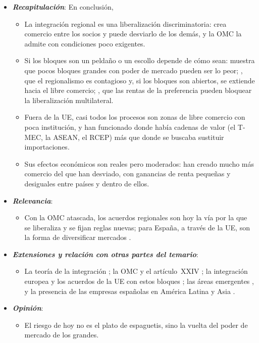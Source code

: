 \documentclass[11pt]{article}
\begin{document}
\begin{itemize}
\item \textbf{\emph{Recapitulación}}: En conclusión,
  \begin{itemize}
  \item La integración regional es una liberalización discriminatoria: crea comercio entre los socios y puede desviarlo de los demás, y la OMC la admite con condiciones poco exigentes.
  \item Si los bloques son un peldaño o un escollo depende de cómo sean:  muestra que pocos bloques grandes con poder de mercado pueden ser lo peor; , que el regionalismo es contagioso y, si los bloques son abiertos, se extiende hacia el libre comercio; , que las rentas de la preferencia pueden bloquear la liberalización multilateral.
  \item Fuera de la UE, casi todos los procesos son zonas de libre comercio con poca institución, y han funcionado donde había cadenas de valor (el T-MEC, la ASEAN, el RCEP) más que donde se buscaba sustituir importaciones.
  \item Sus efectos económicos son reales pero moderados: han creado mucho más comercio del que han desviado, con ganancias de renta pequeñas y desiguales entre países y dentro de ellos.
  \end{itemize}
\item \textbf{\emph{Relevancia}}:
  \begin{itemize}
  \item Con la OMC atascada, los acuerdos regionales son hoy la vía por la que se liberaliza y se fijan reglas nuevas; para España, a través de la UE, son la forma de diversificar mercados .
  \end{itemize}
\item \textbf{\emph{Extensiones y relación con otras partes del temario}}:
  \begin{itemize}
  \item La teoría de la integración ; la OMC y el artículo~XXIV ; la integración europea  y los acuerdos de la UE con estos bloques ; las áreas emergentes , y la presencia de las empresas españolas en América Latina y Asia .
  \end{itemize}
\item \textbf{\emph{Opinión}}:
  \begin{itemize}
  \item El riesgo de hoy no es el plato de espaguetis, sino la vuelta del poder de mercado de los grandes.

\end{itemize}
\end{itemize}
\end{document}
